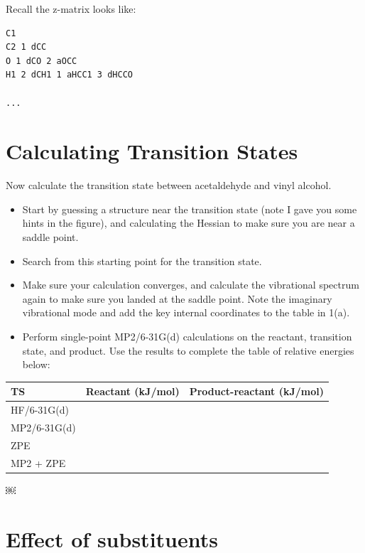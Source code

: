 \documentclass[11pt]{article}
\begin{document}
Recall the z-matrix looks like:

\begin{verbatim}
C1
C2 1 dCC
O 1 dCO 2 aOCC
H1 2 dCH1 1 aHCC1 3 dHCCO 

...
\end{verbatim}


\section{Calculating Transition States}
\label{sec-2}

Now calculate the transition state between acetaldehyde and vinyl alcohol.


\begin{itemize}
\item Start by guessing a structure near the transition state (note I gave you some hints in the figure), and calculating the Hessian to make sure you are near a saddle point.

\item Search from this starting point for the transition state.

\item Make sure your calculation converges, and calculate the vibrational spectrum again to make sure you landed at the saddle point. Note the imaginary vibrational mode and add the key internal coordinates to the table in 1(a).

\item Perform single-point MP2/6-31G(d) calculations on the reactant, transition state, and product. Use the results to complete the table of relative energies below:
\end{itemize}

\begin{center}
\begin{tabular}{lll}
TS & Reactant  (kJ/mol) & Product-reactant  (kJ/mol)\\
\hline
HF/6-31G(d) &  & \\
MP2/6-31G(d) &  & \\
ZPE &  & \\
MP2 + ZPE &  & \\
\end{tabular}
\end{center}
￼

\section{Effect of substituents}
\label{sec-3}
\end{document}
